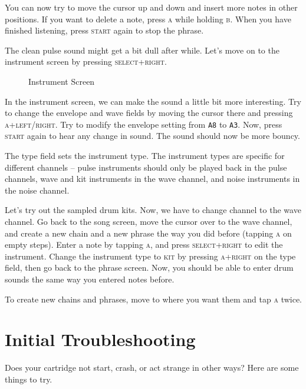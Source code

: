You can now try to move the cursor up and down and insert more notes in other positions. If
you want to delete a note, press \textsc{a} while holding \textsc{b}. When you have finished listening, press
\textsc{start} again to stop the phrase.

The clean pulse sound might get a bit dull after while. Let's move on to the instrument
screen by pressing \textsc{select+right}.

\begin{figure}[hbtp]
\centering
{}
\caption{Instrument Screen}
\label{fig:instr}
\end{figure}

In the instrument screen, we can make the sound a little bit more interesting. Try to change
the envelope and wave fields by moving the cursor there and pressing \textsc{a+left/right}. Try
to modify the envelope setting from \texttt{A8} to \texttt{A3}. Now, press \textsc{start} again to hear any
change in sound. The sound should now be more bouncy.

The type field sets the instrument type. The instrument types are specific for different
channels -- pulse instruments should only be played back in the pulse channels, wave and kit
instruments in the wave channel, and noise instruments in the noise channel.

Let's try out the sampled drum kits. Now, we have to change channel to the wave channel.
Go back to the song screen, move the cursor over to the wave channel, and create a new
chain and a new phrase the way you did before (tapping \textsc{a} on empty steps).
Enter a note by tapping \textsc{a}, and press \textsc{select+right} to edit the instrument.
Change the instrument type to \textsc{kit} by pressing \textsc{a+right} on the type field,
then go back to the phrase screen. Now, you should be able to enter drum sounds the same way
you entered notes before.

To create new chains and phrases, move to where you want them and tap \textsc{a} twice.

\section{Initial Troubleshooting}

Does your cartridge not start, crash, or act strange in other ways? Here are some things to try.

